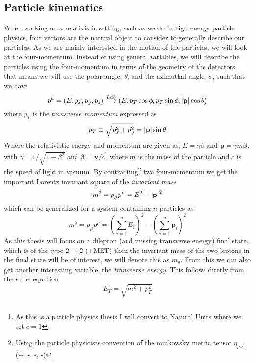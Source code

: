 \documentclass[12pt, a4paper]{book}
\begin{document}
\subsection{Particle kinematics}\label{sec:particle_kinematics}
When working on a relativistic setting, such as we do in high energy particle physics, four vectors are the natural object to consider to generally describe our particles. As we are mainly interested in the motion of the particles, 
we will look at the four-momentum. Instead of using general variables, we will describe the particles using the four-momentum in terms of the geometry of the detectors, that means we will use 
the polar angle, $\theta$, and the azimuthal angle, $\phi$, such that we have
\begin{equation}\label{eq:four-momentum}
    p^\mu = (E, p_x, p_y, p_z) \overset{Lab}{\longrightarrow} (E, p_T\cos\phi, p_T\sin\phi, \abs{\mathbf{p}}\cos\theta)
\end{equation}
where $p_T$ is the \textit{transverse momentum} expressed as
\begin{equation}\label{eq:transverse_momentum}
    p_T \equiv\sqrt{p_x^2 +p_y^2} = \abs{\mathbf{p}}\sin\theta
\end{equation}
Where the relativistic energy and momentum are given as, $E=\gamma\beta$ and $\mathbf{p}=\gamma m\bm\beta$, with $\gamma = 1/\sqrt{1-\beta^2}$ and $\bm\beta = \mathbf{v}/c$\footnote{As this is a particle physics thesis I will convert to Natural Units where we set $c=1$} 
where $m$ is the mass of the particle 
and $c$ is the speed of light in vacuum. By contracting\footnote{Using the particle physicists convention of the minkowsky metric tensor $\eta_{\mu\nu}$,  (+, -, -, -)} two four-momentum we get the important Lorentz invariant 
square of the \textit{invariant mass}
$$
    m^2 = p_\mu p^\mu = E^2 - \abs{\mathbf{p}}^2 
$$
which can be generalized for a system containing $n$ particles as
\begin{equation}\label{eq:invariant_mass}
    m^2 = p_\mu p^\mu = \left(\sum_{i=1}^n E_i\right)^2 - \left(\sum_{i=1}^n\mathbf{p}_i\right)^2
\end{equation}
As this thesis will focus on a dilepton (and missing transverse energy) final state, which is of the type $2\rightarrow2$ (+MET) then the invariant mass of the two leptons in the final state will be of interest, 
we will denote this as $m_{ll}$. From this we can also get another interesting variable, the \textit{transverse energy}. This follows diretly from the same equation
\begin{equation}\label{eq:transverse_energy}
    E_T = \sqrt{m^2 + p_T^2}
\end{equation}
\end{document}
